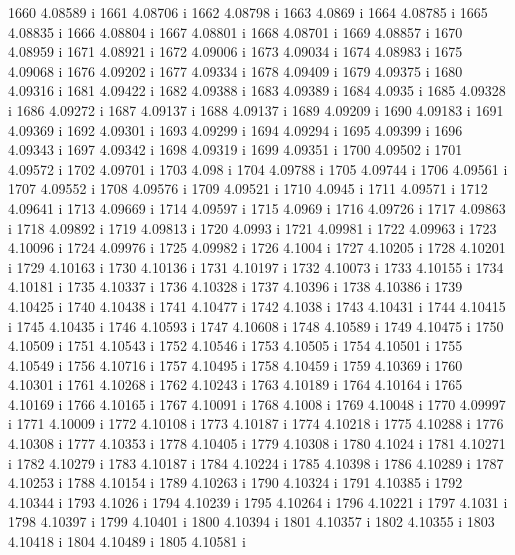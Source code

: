  1660  4.08589  i
 1661  4.08706  i
 1662  4.08798  i
 1663  4.0869  i
 1664  4.08785  i
 1665  4.08835  i
 1666  4.08804  i
 1667  4.08801  i
 1668  4.08701  i
 1669  4.08857  i
 1670  4.08959  i
 1671  4.08921  i
 1672  4.09006  i
 1673  4.09034  i
 1674  4.08983  i
 1675  4.09068  i
 1676  4.09202  i
 1677  4.09334  i
 1678  4.09409  i
 1679  4.09375  i
 1680  4.09316  i
 1681  4.09422  i
 1682  4.09388  i
 1683  4.09389  i
 1684  4.0935  i
 1685  4.09328  i
 1686  4.09272  i
 1687  4.09137  i
 1688  4.09137  i
 1689  4.09209  i
 1690  4.09183  i
 1691  4.09369  i
 1692  4.09301  i
 1693  4.09299  i
 1694  4.09294  i
 1695  4.09399  i
 1696  4.09343  i
 1697  4.09342  i
 1698  4.09319  i
 1699  4.09351  i
 1700  4.09502  i
 1701  4.09572  i
 1702  4.09701  i
 1703  4.098  i
 1704  4.09788  i
 1705  4.09744  i
 1706  4.09561  i
 1707  4.09552  i
 1708  4.09576  i
 1709  4.09521  i
 1710  4.0945  i
 1711  4.09571  i
 1712  4.09641  i
 1713  4.09669  i
 1714  4.09597  i
 1715  4.0969  i
 1716  4.09726  i
 1717  4.09863  i
 1718  4.09892  i
 1719  4.09813  i
 1720  4.0993  i
 1721  4.09981  i
 1722  4.09963  i
 1723  4.10096  i
 1724  4.09976  i
 1725  4.09982  i
 1726  4.1004  i
 1727  4.10205  i
 1728  4.10201  i
 1729  4.10163  i
 1730  4.10136  i
 1731  4.10197  i
 1732  4.10073  i
 1733  4.10155  i
 1734  4.10181  i
 1735  4.10337  i
 1736  4.10328  i
 1737  4.10396  i
 1738  4.10386  i
 1739  4.10425  i
 1740  4.10438  i
 1741  4.10477  i
 1742  4.1038  i
 1743  4.10431  i
 1744  4.10415  i
 1745  4.10435  i
 1746  4.10593  i
 1747  4.10608  i
 1748  4.10589  i
 1749  4.10475  i
 1750  4.10509  i
 1751  4.10543  i
 1752  4.10546  i
 1753  4.10505  i
 1754  4.10501  i
 1755  4.10549  i
 1756  4.10716  i
 1757  4.10495  i
 1758  4.10459  i
 1759  4.10369  i
 1760  4.10301  i
 1761  4.10268  i
 1762  4.10243  i
 1763  4.10189  i
 1764  4.10164  i
 1765  4.10169  i
 1766  4.10165  i
 1767  4.10091  i
 1768  4.1008  i
 1769  4.10048  i
 1770  4.09997  i
 1771  4.10009  i
 1772  4.10108  i
 1773  4.10187  i
 1774  4.10218  i
 1775  4.10288  i
 1776  4.10308  i
 1777  4.10353  i
 1778  4.10405  i
 1779  4.10308  i
 1780  4.1024  i
 1781  4.10271  i
 1782  4.10279  i
 1783  4.10187  i
 1784  4.10224  i
 1785  4.10398  i
 1786  4.10289  i
 1787  4.10253  i
 1788  4.10154  i
 1789  4.10263  i
 1790  4.10324  i
 1791  4.10385  i
 1792  4.10344  i
 1793  4.1026  i
 1794  4.10239  i
 1795  4.10264  i
 1796  4.10221  i
 1797  4.1031  i
 1798  4.10397  i
 1799  4.10401  i
 1800  4.10394  i
 1801  4.10357  i
 1802  4.10355  i
 1803  4.10418  i
 1804  4.10489  i
 1805  4.10581  i
